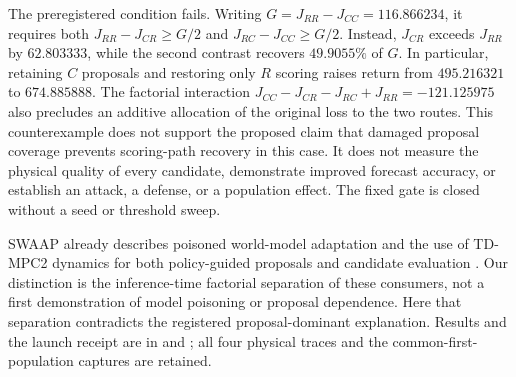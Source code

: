 The preregistered condition fails. Writing
$G=J_{RR}-J_{CC}=116.866234$, it requires both
$J_{RR}-J_{CR}\geq G/2$ and $J_{RC}-J_{CC}\geq G/2$.
Instead, $J_{CR}$ exceeds $J_{RR}$ by $62.803333$, while the second contrast
recovers $49.9055\%$ of $G$.
In particular, retaining $C$ proposals and restoring only $R$ scoring raises
return from $495.216321$ to $674.885888$.
The factorial interaction
$J_{CC}-J_{CR}-J_{RC}+J_{RR}=-121.125975$ also precludes an additive
allocation of the original loss to the two routes.
This counterexample does not support the proposed claim that damaged
proposal coverage prevents scoring-path recovery in this case.
It does not measure the physical quality of every candidate, demonstrate
improved forecast accuracy, or establish an attack, a defense, or a
population effect. The fixed gate is closed without a seed or threshold sweep.

SWAAP already describes poisoned world-model adaptation and the use of
TD-MPC2 dynamics for both policy-guided proposals and candidate evaluation
\cite{hu2026swaap}. Our distinction is the inference-time factorial separation
of these consumers, not a first demonstration of model poisoning or proposal
dependence. Here that separation contradicts the registered proposal-dominant
explanation. Results and the launch receipt are in
 and
; all four
physical traces and the common-first-population captures are retained.
